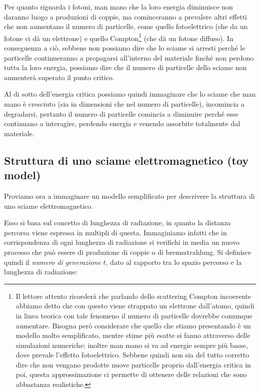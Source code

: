 Per quanto riguarda i fotoni, man mano che la loro energia diminuisce non daranno luogo a produzioni di coppie, ma cominceranno a prevalere altri effetti che non aumentano il numero di particelle, come quello fotoelettrico (che da un fotone ci dà un elettrone) e quello Compton\footnote{Il lettore attento ricorderà che parlando dello scattering Compton incoerente abbiamo detto che con questo viene strappato un elettrone dall'atomo, quindi in linea teorica con tale fenomeno il numero di particelle dovrebbe comunque aumentare. Bisogna però considerare che quello che stiamo presentando è un modello molto semplificato, mentre stime più esatte si fanno attraverso delle simulazioni numeriche; inoltre man mano si va ad energie sempre più basse, dove prevale l'effetto fotoelettrico. Sebbene quindi non sia del tutto corretto dire che non vengano prodotte nuove particelle proprio dall'energia critica in poi, questa approssimazione ci permette di ottenere delle relazioni che sono abbastanza realistiche.} (che dà un fotone diffuso). In conseguenza a ciò, sebbene non possiamo dire che lo sciame si arresti perché le particelle continueranno a propagarsi all'interno del materiale finché non perdono tutta la loro energia, possiamo dire che il numero di particelle dello sciame non aumenterà superato il punto critico.

Al di sotto dell'energia critica possiamo quindi immaginare che lo sciame che man mano è cresciuto (sia in dimensioni che nel numero di particelle), incomincia a degradarsi, pertanto il numero di particelle comincia a diminuire perché esse continuano a interagire, perdendo energia e venendo assorbite totalmente dal materiale.

\subsection{Struttura di uno sciame elettromagnetico (toy model)}

Proviamo ora a immaginare un modello semplificato per descrivere la struttura di uno sciame elettromagnetico.

Esso si basa sul concetto di lunghezza di radiazione, in quanto la distanza percorsa viene espressa in multipli di questa. Immaginiamo infatti che in corrispondenza di ogni lunghezza di radiazione si verifichi in media un nuovo processo che può essere di produzione di coppie o di bremsstrahlung. Si definisce quindi il \textit{numero di generazione} $t$, dato al rapporto tra lo spazio percorso e la lunghezza di radiazione:

